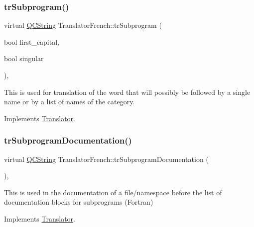 \mbox{\label{class_translator_french_a5a77669a530a62344851ab5dedb9d211}} 
\subsubsection{\texorpdfstring{trSubprogram()}{trSubprogram()}}
{\footnotesize\ttfamily virtual \mbox{\hyperlink{class_q_c_string}{Q\+C\+String}} Translator\+French\+::tr\+Subprogram (\begin{DoxyParamCaption}\item[{bool}]{first\+\_\+capital,  }\item[{bool}]{singular }\end{DoxyParamCaption})\hspace{0.3cm}{\ttfamily [inline]}, {\ttfamily [virtual]}}

This is used for translation of the word that will possibly be followed by a single name or by a list of names of the category. 

Implements \mbox{\hyperlink{class_translator}{Translator}}.

\mbox{\label{class_translator_french_a3e9ab383a289f346c4c6d3abe7d2193d}} 
\subsubsection{\texorpdfstring{trSubprogramDocumentation()}{trSubprogramDocumentation()}}
{\footnotesize\ttfamily virtual \mbox{\hyperlink{class_q_c_string}{Q\+C\+String}} Translator\+French\+::tr\+Subprogram\+Documentation (\begin{DoxyParamCaption}{ }\end{DoxyParamCaption})\hspace{0.3cm}{\ttfamily [inline]}, {\ttfamily [virtual]}}

This is used in the documentation of a file/namespace before the list of documentation blocks for subprograms (Fortran) 

Implements \mbox{\hyperlink{class_translator}{Translator}}.

\mbox{\label{class_translator_french_a4f87502654169d77935e21bae666f846}} 
